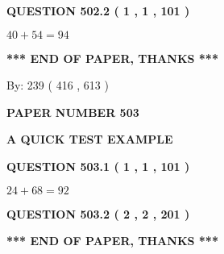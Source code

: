 \documentclass[12pt]{article}
\begin{document}
  
  
\vspace{0.2in}
  
{\textbf{\Large{QUESTION
502.2 
 ( 1 , 1 , 101 )
}}}
  
  
 
 

$ %
40 +  %
54=   %
94$
 
 
   
   
 \vspace{0.2in}
 
   
   
   
   
\vspace{1.0in} 
{\textbf{\large{ *** END OF PAPER, THANKS *** }}} 
   
   
\hspace{1.0in} By: 
 239 ( 416 ,  613 )
   
   
   
   
\newpage 
\setcounter{page}{ 
   503001 } 
   
   
   
   
 {\textbf{ \Large{ PAPER NUMBER  503  }}}
   
   
\vspace{0.2in}
   
   
   
   
   
   
 \vspace{0.2in}
{\LARGE {\textbf{ A QUICK TEST EXAMPLE}}}
   
   
  
\vspace{0.2in}
  
{\textbf{\Large{QUESTION
503.1 
 ( 1 , 1 , 101 )
}}}
  
  
 
 

$ %
24 +  %
68=   %
92$
 
 
  
\vspace{0.2in}
  
{\textbf{\Large{QUESTION
503.2 
 ( 2 , 2 , 201 )
}}}
  
  
   
   
 \vspace{0.2in}
 
   
   
   
   
\vspace{1.0in} 
{\textbf{\large{ *** END OF PAPER, THANKS *** }}} 
   
\end{document}
